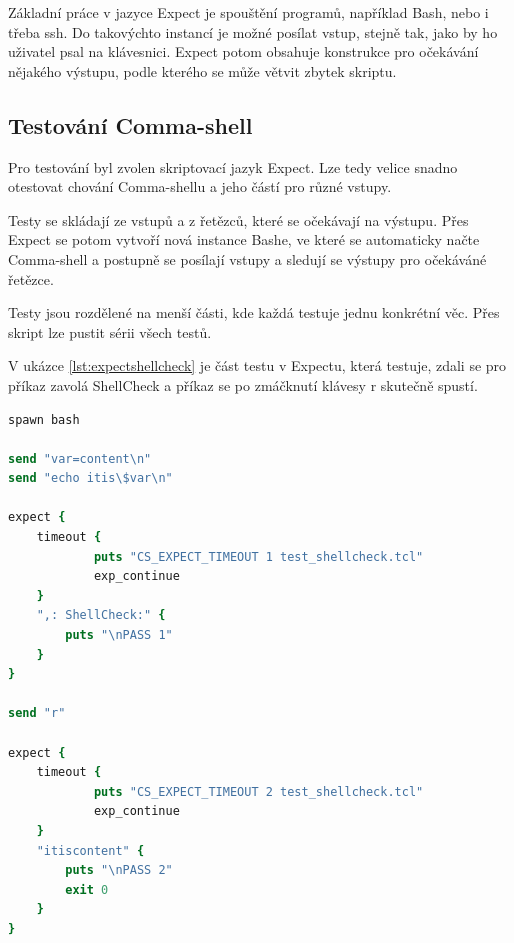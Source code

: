 \documentclass[thesis=M,czech]{FITthesis}[2012/06/26]
\begin{document}
Základní práce v jazyce Expect je spouštění programů, například Bash, nebo i třeba ssh. Do takovýchto instancí je možné posílat vstup, stejně tak, jako by ho uživatel psal na klávesnici. Expect potom obsahuje konstrukce pro očekávání nějakého výstupu, podle kterého se může větvit zbytek skriptu.



\subsection{Testování Comma-shell}

Pro testování byl zvolen skriptovací jazyk Expect. Lze tedy velice snadno otestovat chování Comma-shellu a jeho částí pro různé vstupy.

Testy se skládají ze vstupů a z řetězců, které se očekávají na výstupu. Přes Expect se potom vytvoří nová instance Bashe, ve které se automaticky načte Comma-shell a postupně se posílají vstupy a sledují se výstupy pro očekáváné řetězce.

Testy jsou rozdělené na menší části, kde každá testuje jednu konkrétní věc. Přes skript lze pustit sérii všech testů.

V ukázce \ref{lst:expectshellcheck} je část testu v Expectu, která testuje, zdali se pro příkaz zavolá ShellCheck a příkaz se po zmáčknutí klávesy r skutečně spustí. 


\begin{minipage}{\linewidth}
\begin{lstlisting}[language=tcl, caption={Expect test}, label={lst:expectshellcheck}]
spawn bash

send "var=content\n"
send "echo itis\$var\n"

expect {
	timeout {
			puts "CS_EXPECT_TIMEOUT 1 test_shellcheck.tcl"
			exp_continue
	}
	",: ShellCheck:" {
		puts "\nPASS 1"
	}
}

send "r"

expect {
	timeout {
			puts "CS_EXPECT_TIMEOUT 2 test_shellcheck.tcl"
			exp_continue
	}
	"itiscontent" {
		puts "\nPASS 2"
		exit 0
	}
}
\end{lstlisting}
\end{minipage}
\end{document}

